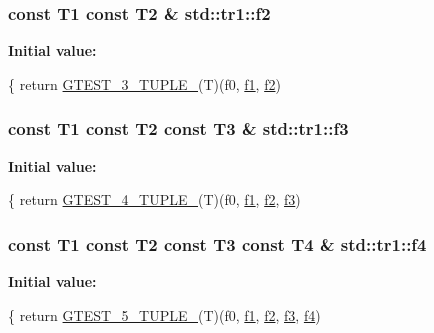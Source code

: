 \subsubsection[{\texorpdfstring{f2}{f2}}]{\setlength{\rightskip}{0pt plus 5cm}const T1 const T2 \& std\+::tr1\+::f2}\hypertarget{namespacestd_1_1tr1_a87dd9e009868361317f587126dba63d4}{}\label{namespacestd_1_1tr1_a87dd9e009868361317f587126dba63d4}
{\bfseries Initial value\+:}
\begin{DoxyCode}
\{
  \textcolor{keywordflow}{return} \hyperlink{gtest-tuple_8h_af2c3eab3f1a5197b408fce44eb3ed9da}{GTEST\_3\_TUPLE\_}(T)(f0, \hyperlink{namespacestd_1_1tr1_a9c0fa65b105f8e2f58ba59ecf75fd000}{f1}, \hyperlink{namespacestd_1_1tr1_a87dd9e009868361317f587126dba63d4}{f2})
\end{DoxyCode}
\subsubsection[{\texorpdfstring{f3}{f3}}]{\setlength{\rightskip}{0pt plus 5cm}const T1 const T2 const T3 \& std\+::tr1\+::f3}\hypertarget{namespacestd_1_1tr1_a0f7c3b47d27d42d82d1a333ea420ce4e}{}\label{namespacestd_1_1tr1_a0f7c3b47d27d42d82d1a333ea420ce4e}
{\bfseries Initial value\+:}
\begin{DoxyCode}
\{
  \textcolor{keywordflow}{return} \hyperlink{gtest-tuple_8h_a3625feb24d5e6eb9926fd558e4a2e3ff}{GTEST\_4\_TUPLE\_}(T)(f0, \hyperlink{namespacestd_1_1tr1_a9c0fa65b105f8e2f58ba59ecf75fd000}{f1}, \hyperlink{namespacestd_1_1tr1_a87dd9e009868361317f587126dba63d4}{f2}, \hyperlink{namespacestd_1_1tr1_a0f7c3b47d27d42d82d1a333ea420ce4e}{f3})
\end{DoxyCode}
\subsubsection[{\texorpdfstring{f4}{f4}}]{\setlength{\rightskip}{0pt plus 5cm}const T1 const T2 const T3 const T4 \& std\+::tr1\+::f4}\hypertarget{namespacestd_1_1tr1_adc796e02b7385d526aff708189564f67}{}\label{namespacestd_1_1tr1_adc796e02b7385d526aff708189564f67}
{\bfseries Initial value\+:}
\begin{DoxyCode}
\{
  \textcolor{keywordflow}{return} \hyperlink{gtest-tuple_8h_a64e6f4a4cf55f62cde94066c6d5d5c74}{GTEST\_5\_TUPLE\_}(T)(f0, \hyperlink{namespacestd_1_1tr1_a9c0fa65b105f8e2f58ba59ecf75fd000}{f1}, \hyperlink{namespacestd_1_1tr1_a87dd9e009868361317f587126dba63d4}{f2}, \hyperlink{namespacestd_1_1tr1_a0f7c3b47d27d42d82d1a333ea420ce4e}{f3}, \hyperlink{namespacestd_1_1tr1_adc796e02b7385d526aff708189564f67}{f4})
\end{DoxyCode}
